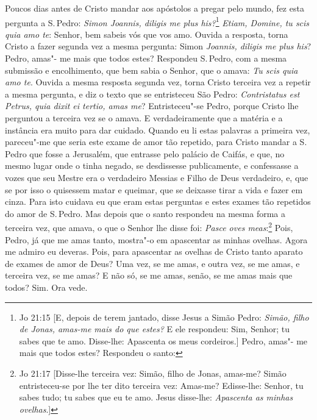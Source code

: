 Poucos dias antes de Cristo mandar aos apóstolos a pregar pelo mundo,
fez esta pergunta a S.\,Pedro: \emph{Simon Joannis, diligis me plus his?}\footnote{Jo 21:15 [E, depois de terem jantado, disse Jesus a Simão Pedro: \emph{Simão, filho de Jonas, amas-me
mais do que estes?} E ele respondeu: Sim, Senhor; tu sabes que te amo. Disse-lhe: Apascenta os meus cordeiros.]
 Pedro, amas"- me mais que todos estes? Respondeu o santo:
}
\emph{Etiam, Domine, tu scis quia amo te}: Senhor, bem sabeis vós que
vos amo. Ouvida a resposta, torna Cristo a fazer segunda vez a mesma
pergunta: Simon \emph{Joannis, diligis me plus his}? Pedro, amas"- me
mais que todos estes? Respondeu S.\,Pedro, com a mesma submissão e
encolhimento, que bem sabia o Senhor, que o amava: \emph{Tu scis quia
amo te}. Ouvida a mesma resposta segunda vez, torna Cristo terceira vez
a repetir a mesma pergunta, e diz o texto que se entristeceu São Pedro:
\emph{Contristatus est Petrus, quia dixit ei tertio, amas me}? Entristeceu"-se Pedro,
porque Cristo lhe perguntou a terceira vez se o amava. E
verdadeiramente que a matéria e a instância era muito para dar cuidado.
Quando eu li estas palavras a primeira vez, pareceu"-me que seria este
exame de amor tão repetido, para Cristo mandar a S.\,Pedro que fosse a
Jerusalém, que entrasse pelo palácio de Caifás, e que, no mesmo lugar
onde o tinha negado, se desdissesse publicamente, e confessasse a vozes
que seu Mestre era o verdadeiro Messias e Filho de Deus verdadeiro, e,
que se por isso o quisessem matar e queimar, que se deixasse tirar a
vida e fazer em cinza. Para isto cuidava eu que eram estas perguntas e
estes exames tão repetidos do amor de S.\,Pedro. Mas depois que o santo
respondeu na mesma forma a terceira vez, que amava, o que o Senhor lhe
disse foi: \emph{Pasce oves meas}:\footnote{Jo 21:17 [Disse-lhe terceira vez: Simão, filho de Jonas, amas-me? Simão entristeceu-se por lhe ter dito terceira vez: Amas-me? Edisse-lhe: Senhor, tu sabes tudo; tu sabes que eu te amo. Jesus disse-lhe: \emph{Apascenta as minhas ovelhas}.]} Pois, Pedro, já que me amas tanto, mostra"-o em apascentar as minhas ovelhas. Agora me admiro eu deveras. Pois, para apascentar as ovelhas de Cristo tanto
aparato de exames de amor de Deus? Uma vez, se me amas, e outra vez, se
me amas, e terceira vez, se me amas? E não só, se me amas, senão, se me
amas mais que todos? Sim. Ora vede.

